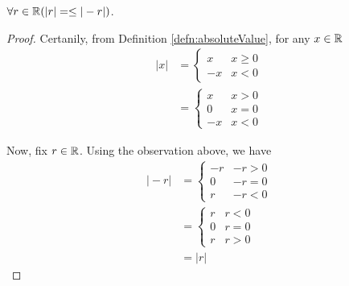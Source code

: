 \begin{lem}
\label{lem:absoluteValueIsSymetric}
  $\forall r\in\mathbb{R}(\vert r\vert=\leq\vert -r\vert)$.
\end{lem}
\begin{proof}
  Certanily, from Definition \ref{defn:absoluteValue}, for any $x\in\mathbb{R}$
  \begin{align*}
    \vert x\vert &= \begin{cases}
        x & x\geq 0 \\
        -x& x < 0
     \end{cases}\\
      &= \begin{cases}
          x & x> 0 \\
          0 & x=0 \\
          -x& x < 0
       \end{cases}
  \end{align*}


  Now, fix $r\in\mathbb{R}$.
  Using the observation above, we have
  \begin{align*}
    \vert -r \vert &= \begin{cases}
                        -r &-r > 0 \\
                        0 & -r = 0 \\
                        r & -r < 0
                      \end{cases}\\
                  &= \begin{cases}
                        r & r < 0 \\
                        0 & r = 0 \\
                        r & r > 0
                      \end{cases}\\
                  &= \vert r \vert
  \end{align*}
\end{proof}


